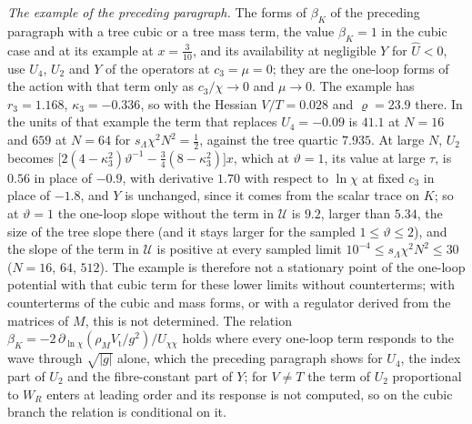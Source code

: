 \emph{The example of the preceding paragraph.} The forms of \(\beta_K\) of the preceding paragraph with a tree cubic or a tree mass term, the value \(\beta_K=1\) in the cubic case and at its example at \(x=\tfrac3{10}\), and its availability at negligible \(Y\) for \(\hat U<0\), use \(U_4\), \(U_2\) and \(Y\) of the operators at \(c_3=\mu=0\); they are the one-loop forms of the action with that term only as \(c_3/\chi\to0\) and \(\mu\to0\). The example has \(r_3=1.168\), \(\kappa_3=-0.336\), so with the Hessian \(V/T=0.028\) and \(\varrho=23.9\) there. In the units of that example the term that replaces \(U_4=-0.09\) is \(41.1\) at \(N=16\) and \(659\) at \(N=64\) for \(s_\Lambda\chi^2N^2=\tfrac12\), against the tree quartic \(7.935\). At large \(N\), \(U_2\) becomes \(\bigl[2(4-\kappa_3^2)\vartheta^{-1}-\tfrac34(8-\kappa_3^2)\bigr]x\), which at \(\vartheta=1\), its value at large \(\tau\), is \(0.56\) in place of \(-0.9\), with derivative \(1.70\) with respect to \(\ln\chi\) at fixed \(c_3\) in place of \(-1.8\), and \(Y\) is unchanged, since it comes from the scalar trace on \(K\); so at \(\vartheta=1\) the one-loop slope without the term in \(\mathcal U\) is \(9.2\), larger than \(5.34\), the size of the tree slope there (and it stays larger for the sampled \(1\le\vartheta\le2\)), and the slope of the term in \(\mathcal U\) is positive at every sampled limit \(10^{-4}\le s_\Lambda\chi^2N^2\le30\) (\(N=16\), \(64\), \(512\)). The example is therefore not a stationary point of the one-loop potential with that cubic term for these lower limits without counterterms; with counterterms of the cubic and mass forms, or with a regulator derived from the matrices of \(M\), this is not determined. The relation \(\beta_K=-2\,\partial_{\ln\chi}(\rho_MV_{\mathrm t}/g^2)/U_{\chi\chi}\) holds where every one-loop term responds to the wave through \(\sqrt{|g|}\) alone, which the preceding paragraph shows for \(U_4\), the index part of \(U_2\) and the fibre-constant part of \(Y\); for \(V\ne T\) the term of \(U_2\) proportional to \(W_R\) enters at leading order and its response is not computed, so on the cubic branch the relation is conditional on it.

